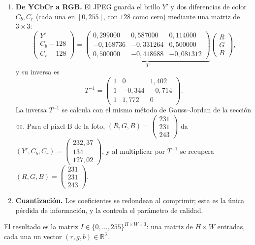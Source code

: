 \begin{enumerate}
\begin{equation*}
        \end{equation*}
        El coeficiente $Y_{10}=-780$ es el más grande: el bloque pasa de oscuro
        (arriba) a claro (abajo), que es la frecuencia vertical más baja. Aplicando
        $C^{T}YC$ y sumando $128$ se recupera $X$ con un error máximo de
        $1{,}4\times10^{-13}$ (solo redondeo del computador), y se comprueba $\max|CC^T-I|=6{,}7\times10^{-16}$.
  \item \textbf{De YCbCr a RGB.} El JPEG guarda el brillo $Y'$ y dos diferencias de
        color $C_b,C_r$ (cada una en $[0,255]$, con $128$ como cero) mediante una matriz de $3\times3$:
        \begin{equation}
        \begin{pmatrix}Y'\\C_b-128\\C_r-128\end{pmatrix}=
        \underbrace{\begin{pmatrix} 0{,}299000 & 0{,}587000 & 0{,}114000 \\ -0{,}168736 & -0{,}331264 & 0{,}500000 \\ 0{,}500000 & -0{,}418688 & -0{,}081312 \end{pmatrix}}_{T}\begin{pmatrix}R\\G\\B\end{pmatrix},
        \end{equation}
        y su inversa es
        \begin{equation}
        T^{-1}=\begin{pmatrix} 1 & 0 & 1{,}402 \\ 1 & -0{,}344 & -0{,}714 \\ 1 & 1{,}772 & 0 \end{pmatrix} .
        \end{equation}
        La inversa $T^{-1}$ se calcula con el mismo método de Gauss--Jordan de la
        sección «». Para el píxel B de la foto, $(R,G,B)=\begin{pmatrix} 231 \\ 231 \\ 243 \end{pmatrix}$ da
        $(Y',C_b,C_r)=\begin{pmatrix} 232{,}37 \\ 134 \\ 127{,}02 \end{pmatrix}$, y al multiplicar por $T^{-1}$ se recupera $(R,G,B)=\begin{pmatrix} 231 \\ 231 \\ 243 \end{pmatrix}$.
  \item \textbf{Cuantización.} Los coeficientes se redondean al comprimir; esta es la única
        pérdida de información, y la controla el parámetro de calidad.
\end{enumerate}
El resultado es la matriz $I\in\{0,\dots,255\}^{H\times W\times3}$: una matriz de
$H\times W$ entradas, cada una un vector $(r,g,b)\in\mathbb{R}^3$.

